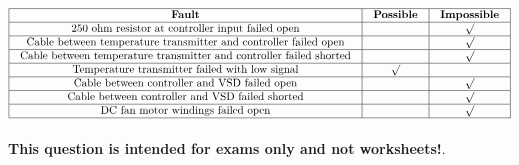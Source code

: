 






$$\vbox{\offinterlineskip
\halign{\strut
\vrule \quad\hfil # \ \hfil & 
\vrule \quad\hfil # \ \hfil & 
\vrule \quad\hfil # \ \hfil \vrule \cr
\noalign{\hrule}
%
{\bf Fault} & {\bf Possible} & {\bf Impossible} \cr
%
\noalign{\hrule}
%
250 ohm resistor at controller input failed open &  & $\surd$ \cr
%
\noalign{\hrule}
%
Cable between temperature transmitter and controller failed open &  & $\surd$ \cr
%
\noalign{\hrule}
%
Cable between temperature transmitter and controller failed shorted &  & $\surd$ \cr
%
\noalign{\hrule}
%
Temperature transmitter failed with low signal & $\surd$ &  \cr
%
\noalign{\hrule}
%
Cable between controller and VSD failed open &  & $\surd$ \cr
%
\noalign{\hrule}
%
Cable between controller and VSD failed shorted &  & $\surd$ \cr
%
\noalign{\hrule}
%
DC fan motor windings failed open &  & $\surd$ \cr
%
\noalign{\hrule}
} %
}$$ %








{\bf This question is intended for exams only and not worksheets!}.



